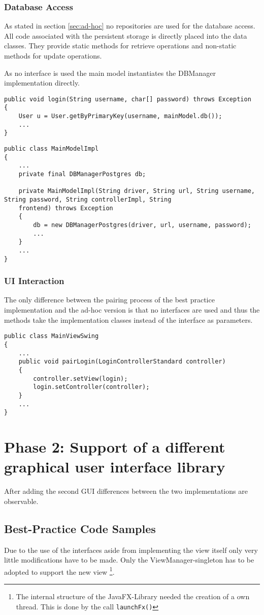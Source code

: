 \subsubsection{Database Access}
As stated in section \ref{sec:ad-hoc} no repositories are used for the database access. All code associated with the persistent storage is directly placed into the data classes. They provide static methods for retrieve operations and non-static methods for update operations. 

As no interface is used the main model instantiates the DBManager implementation directly. 

\begin{lstlisting}
public void login(String username, char[] password) throws Exception
{
	User u = User.getByPrimaryKey(username, mainModel.db());
	...
}
\end{lstlisting}

\begin{lstlisting}
public class MainModelImpl
{
	...
	private final DBManagerPostgres db;
	
	private MainModelImpl(String driver, String url, String username, String password, String controllerImpl, String
	frontend) throws Exception
	{
		db = new DBManagerPostgres(driver, url, username, password);
		...
	}
	...
}
\end{lstlisting}

\subsubsection{UI Interaction}
The only difference between the pairing process of the best practice implementation and the ad-hoc version is that no interfaces are used and thus the methods take the implementation  classes instead of the interface as parameters. 

\begin{lstlisting}
public class MainViewSwing
{
	...
	public void pairLogin(LoginControllerStandard controller)
	{
		controller.setView(login);
		login.setController(controller);
	}
	...
}
\end{lstlisting}


\section{Phase 2: Support of a different graphical user interface library}
After adding the second GUI differences between the two implementations are observable.

\subsection{Best-Practice Code Samples}
Due to the use of the interfaces aside from implementing the view itself only very little modifications have to be made. Only the ViewManager-singleton has to be adopted to support the new view \footnote{The internal structure of the JavaFX-Library needed the creation of a own thread. This is done by the call \texttt{launchFx()}}.

